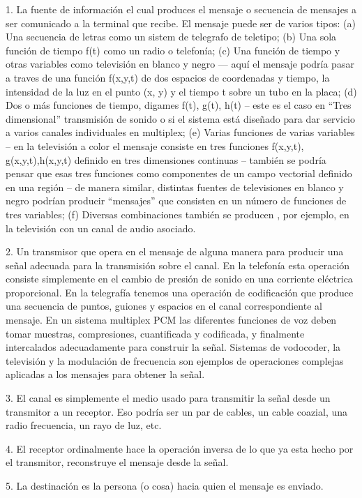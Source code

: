 1. La fuente de información el cual produces el mensaje o secuencia de
mensajes a ser comunicado a la terminal que recibe. El mensaje puede
ser de varios tipos: (a) Una secuencia de letras como un sistem de
telegrafo de teletipo; (b) Una sola función de tiempo f(t) como un
radio o telefonía; (c) Una función de tiempo y otras variables como
televisión en blanco y negro --- aquí el mensaje podría pasar a traves
de una función f(x,y,t) de dos espacios de coordenadas y tiempo, la
intensidad de la luz en el punto (x, y) y el tiempo t sobre un tubo en
la placa; (d) Dos o más funciones de tiempo, digames f(t), g(t), h(t)
--  este es el caso en ``Tres dimensional'' transmisión de sonido o si
el
sistema está diseñado para dar servicio a varios canales individuales
en multiplex; (e) Varias funciones de varias variables -- en la
televisión a color el mensaje consiste en tres funciones f(x,y,t),
g(x,y,t),h(x,y,t) definido en tres dimensiones continuas -- también se
podría pensar que esas tres funciones como componentes de un campo
vectorial definido en una región -- de manera similar, distintas
fuentes de televisiones en blanco y negro podrían producir
``mensajes''
que consisten en un número de funciones de tres variables; (f)
Diversas combinaciones también se producen , por ejemplo, en la
televisión con un canal de audio asociado.

2. Un transmisor que opera en el mensaje de alguna manera para
producir una señal adecuada para la transmisión sobre el canal. En la
telefonía esta operación consiste simplemente en el cambio de presión
de sonido en una corriente eléctrica proporcional. En la telegrafía
tenemos una operación de codificación que produce una secuencia de
puntos, guiones y espacios en el canal correspondiente al mensaje. En
un sistema multiplex PCM las diferentes funciones de voz deben tomar
muestras, compresiones, cuantificada y codificada, y finalmente
intercalados adecuadamente para construir la señal. Sistemas de
vodocoder, la televisión y la modulación de frecuencia son ejemplos de
operaciones complejas aplicadas a los mensajes para obtener la señal.

3. El canal es simplemente el medio usado para transmitir la señal
desde un transmitor a un receptor. Eso podría ser un par de cables, un
cable coazial, una radio frecuencia, un rayo de luz, etc.

4. El receptor ordinalmente hace la operación inversa de lo que ya
esta hecho por el transmitor, reconstruye el mensaje desde la señal.

5. La destinación es la persona (o cosa) hacia quien el mensaje es
enviado.

